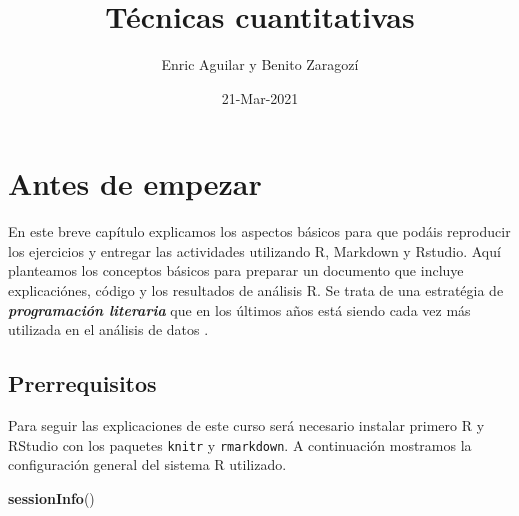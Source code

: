 \documentclass[
]{book}
\title{Técnicas cuantitativas}
\author{Enric Aguilar y Benito Zaragozí}
\date{21-Mar-2021}
\newenvironment{Shaded}{\begin{snugshade}}{\end{snugshade}}
\newcommand{\KeywordTok}[1]{\textcolor[rgb]{0.13,0.29,0.53}{\textbf{#1}}}
\newcommand{\NormalTok}[1]{#1}
\begin{document}
\maketitle

{
\setcounter{tocdepth}{1}
\tableofcontents
}
\hypertarget{antes-de-empezar}{%
\chapter*{Antes de empezar}\label{antes-de-empezar}}

En este breve capítulo explicamos los aspectos básicos para que podáis reproducir los ejercicios y entregar las actividades utilizando R, Markdown y Rstudio. Aquí planteamos los conceptos básicos para preparar un documento que incluye explicaciónes, código y los resultados de análisis R. Se trata de una estratégia de \textbf{\emph{programación literaria}} que en los últimos años está siendo cada vez más utilizada en el análisis de datos \citep{knuth1984literate, xie2015knitr}.

\hypertarget{prerrequisitos}{%
\section{Prerrequisitos}\label{prerrequisitos}}

Para seguir las explicaciones de este curso será necesario instalar primero R y RStudio con los paquetes \texttt{knitr} y \texttt{rmarkdown}. A continuación mostramos la configuración general del sistema R utilizado.

\begin{Shaded}
\begin{Highlighting}[]
\KeywordTok{sessionInfo}\NormalTok{()}
\end{Highlighting}
\end{Shaded}
\end{document}

